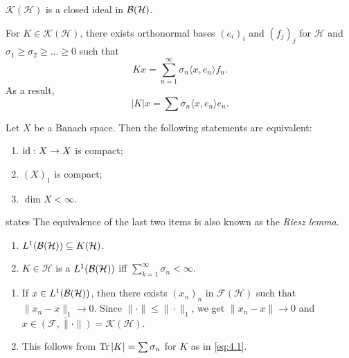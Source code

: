 \begin{remark}
  $\mathcal{K}(\mathcal{H})$ is a closed ideal in $\operatorname{\mathcal{B} (\mathcal{H})}$.
\end{remark}

\begin{theorem}
  For $K \in \mathcal{K} (\mathcal{H})$, there exists orthonormal bases $(e_i)_i$ and $(f_j)_j$ for $\mathcal{H}$
  and $\sigma_1 \geq \sigma_2 \geq \dots \geq 0$ such that 
  \begin{equation}\label{eq:4.1}
    K x = \sum_{n = 1} ^\infty \sigma_n \langle x, e_n \rangle f_n.
  \end{equation}
  As a result, $$|K| x = \sum \sigma_n \langle x, e_n \rangle e_n.$$  
\end{theorem}

\begin{proposition}
  Let $X$ be a Banach space. Then the following statements are equivalent:
  \begin{enumerate}
    \item $\operatorname{id}: X \to X$ is compact;
    \item $(X)_1$ is compact;
    \item $\dim X < \infty$.
  \end{enumerate}states
  The equivalence of the last two items is also known as the \emph{Riesz lemma}.
\end{proposition}

\begin{theorem}
  \begin{enumerate}
    \item $L^1 (\operatorname{\mathcal{B} (\mathcal{H})}) \subseteq K(\mathcal{H})$.
    \item $K \in \mathcal{H}$ is a $L^1 (\operatorname{\mathcal{B} (\mathcal{H})})$ iff $\sum_{k = 1} ^\infty \sigma_n < \infty$.
  \end{enumerate}
\end{theorem}

\begin{myproof}
  \begin{enumerate}
    \item If $x \in L^1 (\operatorname{\mathcal{B} (\mathcal{H})})$, then there exists $(x_n)_n$ in $\mathcal{F} (\mathcal{H})$ such that $\|x_n - x\|_1 \to 0$.
    Since $\| \cdot \| \leq \| \cdot \|_1$, we get $\|x_n - x \| \to 0$ and $x \in \overline{(\mathcal{F}, \| \cdot\|)} = \mathcal{K} (\mathcal{H})$.
    \item This follows from $\operatorname{Tr} |K| = \sum \sigma_n$ for $K$ as in \eqref{eq:4.1}. \qedhere
  \end{enumerate}
\end{myproof}

